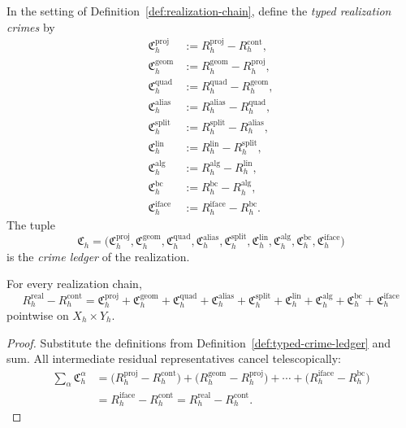 \begin{definition}
\label{def:typed-crime-ledger}
In the setting of Definition~\ref{def:realization-chain}, define the
\emph{typed realization crimes} by
\begin{align*}
\mathfrak C_h^{\mathrm{proj}} &:= R_h^{\mathrm{proj}}-R_h^{\mathrm{cont}},\\
\mathfrak C_h^{\mathrm{geom}} &:= R_h^{\mathrm{geom}}-R_h^{\mathrm{proj}},\\
\mathfrak C_h^{\mathrm{quad}} &:= R_h^{\mathrm{quad}}-R_h^{\mathrm{geom}},\\
\mathfrak C_h^{\mathrm{alias}} &:= R_h^{\mathrm{alias}}-R_h^{\mathrm{quad}},\\
\mathfrak C_h^{\mathrm{split}} &:= R_h^{\mathrm{split}}-R_h^{\mathrm{alias}},\\
\mathfrak C_h^{\mathrm{lin}} &:= R_h^{\mathrm{lin}}-R_h^{\mathrm{split}},\\
\mathfrak C_h^{\mathrm{alg}} &:= R_h^{\mathrm{alg}}-R_h^{\mathrm{lin}},\\
\mathfrak C_h^{\mathrm{bc}} &:= R_h^{\mathrm{bc}}-R_h^{\mathrm{alg}},\\
\mathfrak C_h^{\mathrm{iface}} &:= R_h^{\mathrm{iface}}-R_h^{\mathrm{bc}}.
\end{align*}
The tuple
\[
\mathfrak C_h
=
\bigl(
\mathfrak C_h^{\mathrm{proj}},
\mathfrak C_h^{\mathrm{geom}},
\mathfrak C_h^{\mathrm{quad}},
\mathfrak C_h^{\mathrm{alias}},
\mathfrak C_h^{\mathrm{split}},
\mathfrak C_h^{\mathrm{lin}},
\mathfrak C_h^{\mathrm{alg}},
\mathfrak C_h^{\mathrm{bc}},
\mathfrak C_h^{\mathrm{iface}}
\bigr)
\]
is the \emph{crime ledger} of the realization.
\end{definition}

\begin{theorem}
\label{thm:exact-residual-ledger}
For every realization chain,
\[
R_h^{\mathrm{real}}-R_h^{\mathrm{cont}}
=
\mathfrak C_h^{\mathrm{proj}}
+
\mathfrak C_h^{\mathrm{geom}}
+
\mathfrak C_h^{\mathrm{quad}}
+
\mathfrak C_h^{\mathrm{alias}}
+
\mathfrak C_h^{\mathrm{split}}
+
\mathfrak C_h^{\mathrm{lin}}
+
\mathfrak C_h^{\mathrm{alg}}
+
\mathfrak C_h^{\mathrm{bc}}
+
\mathfrak C_h^{\mathrm{iface}}
\]
pointwise on \(X_h\times Y_h\).
\end{theorem}

\begin{proof}
Substitute the definitions from Definition~\ref{def:typed-crime-ledger} and
sum. All intermediate residual representatives cancel telescopically:
\begin{align*}
\sum_{\alpha}\mathfrak C_h^{\alpha}
&=
\bigl(R_h^{\mathrm{proj}}-R_h^{\mathrm{cont}}\bigr)
+
\bigl(R_h^{\mathrm{geom}}-R_h^{\mathrm{proj}}\bigr)
+
\cdots
+
\bigl(R_h^{\mathrm{iface}}-R_h^{\mathrm{bc}}\bigr)\\
&=
R_h^{\mathrm{iface}}-R_h^{\mathrm{cont}}
=
R_h^{\mathrm{real}}-R_h^{\mathrm{cont}}.
\end{align*}
\end{proof}

